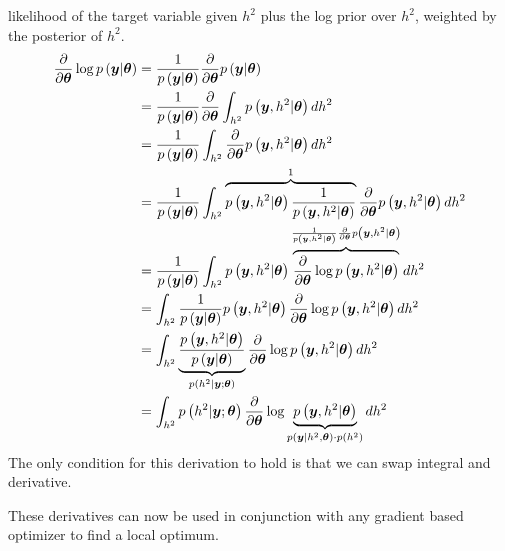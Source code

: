 \documentclass[twoside]{article}
\begin{document}
 likelihood of the target variable given $h^2$ plus the log prior over $h^2$, weighted by the posterior of $h^2$. 
\begin{align}
     \frac{\partial}{\partial \bm{\theta}}\operatorname{log} p\left(\bm{y}|\bm{\theta}\right)
     &=
     \frac{1}{p\left(\bm{y}|\bm{\theta}\right)}\frac{\partial }{\partial \bm{\theta}}p\left(\bm{y}|\bm{\theta}\right)
     \\
     &=
     \frac{1}{p\left(\bm{y}|\bm{\theta}\right)}\frac{\partial }{\partial \bm{\theta}}\int_{h^2} p\left(\bm{y}, h^2 |\bm{\theta}\right) d h^2
     \\
     &=
     \frac{1}{p\left(\bm{y}|\bm{\theta}\right)}\int_{h^2}\frac{\partial }{\partial \bm{\theta}} p\left(\bm{y}, h^2|\bm{\theta}\right) d h^2
     \\
     &=
     \frac{1}{p\left(\bm{y}|\bm{\theta}\right)}\int_{h^2} \overbrace{p\left(\bm{y}, h^2|\bm{\theta}\right)\frac{1}{p\left(\bm{y}, h^2|\bm{\theta}\right)}}^{1} \frac{\partial }{\partial \bm{\theta}} p\left(\bm{y}, h^2|\bm{\theta}\right) d h^2
     \\
     &=
     \frac{1}{p\left(\bm{y}|\bm{\theta}\right)}\int_{h^2} p\left(\bm{y}, h^2|\bm{\theta}\right)  \overbrace{\frac{\partial }{\partial \bm{\theta}} \operatorname{log} p\left(\bm{y},h^2|\bm{\theta}\right)}^{\frac{1}{p\left(\bm{y}, h^2|\bm{\theta}\right)} \frac{\partial }{\partial \bm{\theta}} p\left(\bm{y}, h^2|\bm{\theta}\right)} d h^2
     \\
     &=
     \int_{h^2}\frac{1}{p\left(\bm{y}|\bm{\theta}\right)} p\left(\bm{y}, h^2|\bm{\theta}\right)  \frac{\partial }{\partial \bm{\theta}} \operatorname{log} p\left(\bm{y},h^2|\bm{\theta}\right) d h^2
     \\
     &=
     \int_{h^2}\underbrace{\frac{ p\left(\bm{y},h^2|\bm{\theta}\right) }{p\left(\bm{y}|\bm{\theta}\right)} }_{p\left(h^2 | \bm{y}; \bm{\theta}\right)}\frac{\partial }{\partial \bm{\theta}} \operatorname{log} p\left(\bm{y},h^2|\bm{\theta}\right) d h^2
     \\
     &=
     \int_{h^2}   p\left(h^2 | \bm{y}; \bm{\theta}\right)  \frac{\partial }{\partial \bm{\theta}} \operatorname{log} \underbrace{p\left(\bm{y}, h^2|\bm{\theta}\right)}_{p\left(\bm{y}| h^2, \bm{\theta}\right)\cdot p\left(h^2\right)} d h^2
\end{align}
The only condition for this derivation to hold is that we can swap integral and derivative.


These derivatives can now be used in conjunction with any gradient based optimizer to find a local optimum.

\end{document}
